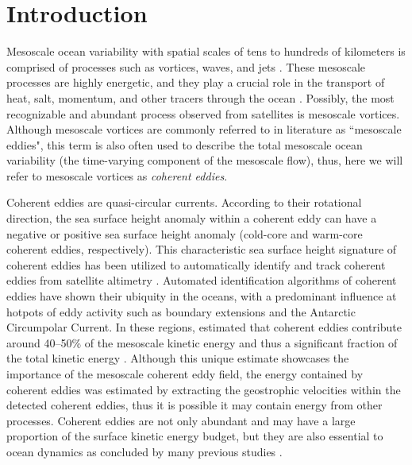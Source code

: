 \documentclass[draft,linenumbers]{agujournal2019}
\begin{document}
\section{Introduction}

Mesoscale ocean variability with spatial scales of tens to hundreds of kilometers is comprised of processes such as vortices, waves, and jets \citep{Ferrari_energy_2009, Fu_Eddy_2010}. 
These mesoscale processes are highly energetic, and they play a crucial role in the transport of heat, salt, momentum, and other tracers through the ocean \citep{Wunsch_energetics_2004, Wyrtki_Eddy_1976, Gill_Energy_1974}. Possibly, the most recognizable and abundant process observed from satellites is mesoscale vortices. Although mesoscale vortices are commonly referred to in literature as ``mesoscale eddies", this term is also often used to describe the total mesoscale ocean variability (the time-varying component of the mesoscale flow), thus, here we will refer to mesoscale vortices as \emph{coherent eddies}. 


Coherent eddies are quasi-circular currents. According to their rotational direction, the sea surface height anomaly within a coherent eddy can have a negative or positive sea surface height anomaly (cold-core and warm-core coherent eddies, respectively). 
This characteristic sea surface height signature of coherent eddies has been utilized to automatically identify and track coherent eddies from satellite altimetry \citep{Cui_eddy_identification_2020,Martinez_TKE_2019, Ashkezari_eddies_2016, Faghmous_A_2015,Chelton_Global_2007}. 
Automated identification algorithms of coherent eddies have shown their ubiquity in the oceans, with a predominant influence at hotpots of eddy activity such as boundary extensions and the Antarctic Circumpolar Current. In these regions, \citet{Chelton_The_2011} estimated that coherent eddies contribute around 40--50\% of the mesoscale kinetic energy \citep{Chelton_The_2011} and thus a significant fraction of the total kinetic energy \citep{Ferrari_energy_2009}. 
Although this unique estimate showcases the importance of the mesoscale coherent eddy field, the energy contained by coherent eddies was estimated by extracting the geostrophic velocities within the detected coherent eddies, thus it is possible it may contain energy from other processes. 
Coherent eddies are not only abundant and may have a large proportion of the surface kinetic energy budget, but they are also essential to ocean dynamics as concluded by many previous studies \citep{Patel_SO_eddies_2020,Schubert_submesoscale_2019,Pilo_eddy_2015,Frenger_Southern_2015,Frenger_Imprint_2013,BeronVera_Agulhas_2013,Siegel_Bio_2011,Hogg_Interdecadal_2006}.
\end{document}
